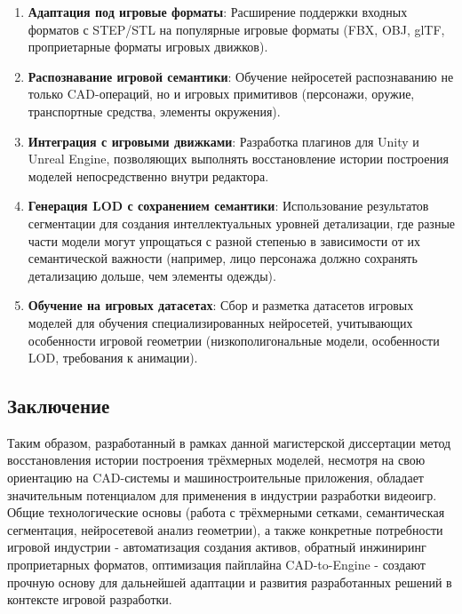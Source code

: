 \begin{enumerate}
    \item \textbf{Адаптация под игровые форматы}: Расширение поддержки входных форматов с STEP/STL на популярные игровые форматы (FBX, OBJ, glTF, проприетарные форматы игровых движков).
    \item \textbf{Распознавание игровой семантики}: Обучение нейросетей распознаванию не только CAD-операций, но и игровых примитивов (персонажи, оружие, транспортные средства, элементы окружения).
    \item \textbf{Интеграция с игровыми движками}: Разработка плагинов для Unity и Unreal Engine, позволяющих выполнять восстановление истории построения моделей непосредственно внутри редактора.
    \item \textbf{Генерация LOD с сохранением семантики}: Использование результатов сегментации для создания интеллектуальных уровней детализации, где разные части модели могут упрощаться с разной степенью в зависимости от их семантической важности (например, лицо персонажа должно сохранять детализацию дольше, чем элементы одежды).
    \item \textbf{Обучение на игровых датасетах}: Сбор и разметка датасетов игровых моделей для обучения специализированных нейросетей, учитывающих особенности игровой геометрии (низкополигональные модели, особенности LOD, требования к анимации).
\end{enumerate}

\subsection{Заключение}

Таким образом, разработанный в рамках данной магистерской диссертации метод восстановления истории построения трёхмерных моделей, несмотря на свою ориентацию на CAD-системы и машиностроительные приложения, обладает значительным потенциалом для применения в индустрии разработки видеоигр. Общие технологические основы (работа с трёхмерными сетками, семантическая сегментация, нейросетевой анализ геометрии), а также конкретные потребности игровой индустрии - автоматизация создания активов, обратный инжиниринг проприетарных форматов, оптимизация пайплайна CAD-to-Engine - создают прочную основу для дальнейшей адаптации и развития разработанных решений в контексте игровой разработки.


